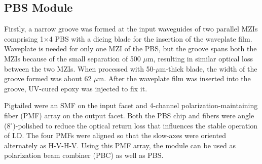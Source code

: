 \documentclass[letterpaper, 10pt]{article}
\begin{document}
\subsection{PBS Module}

Firstly, a narrow groove was formed at the input waveguides of two parallel MZIs comprising 1$\times$4 PBS with a dicing blade for the insertion of the waveplate film.
Waveplate is needed for only one MZI of the PBS, but the groove spans  both the MZIs because of the small separation of 500 $\mu$m, resulting in similar optical loss between the two MZIs.
When processed with 50-$\mu$m-thick blade, the width of the groove formed was about 62 $\mu$m.
After the waveplate film was inserted into the groove, UV-cured epoxy was injected to fix it.

Pigtailed were an SMF on the input facet and 4-channel polarization-maintaining fiber (PMF) array on the output facet.
Both the PBS chip and fibers were angle (8$^\circ$)-polished to reduce the optical return loss that influences the stable operation of LD.
The four PMFs were aligned so that the slow-axes  were oriented alternately as H-V-H-V.
Using this PMF array, the module can be used as polarization beam combiner (PBC) as well as PBS.
\end{document}

